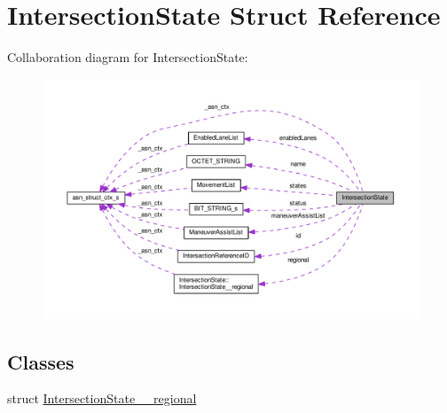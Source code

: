 \hypertarget{structIntersectionState}{}\section{Intersection\+State Struct Reference}
\label{structIntersectionState}


Collaboration diagram for Intersection\+State\+:\nopagebreak
\begin{figure}[H]
\begin{center}
\leavevmode
\includegraphics[width=350pt]{structIntersectionState__coll__graph}
\end{center}
\end{figure}
\subsection*{Classes}
\begin{DoxyCompactItemize}
\item 
struct \hyperlink{structIntersectionState_1_1IntersectionState____regional}{Intersection\+State\+\_\+\+\_\+regional}
\end{DoxyCompactItemize}
